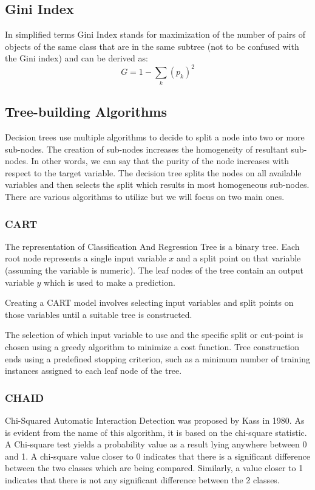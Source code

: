 \documentclass{article}
\begin{document}
\subsection{Gini Index}
In simplified terms Gini Index stands for maximization of the number of pairs of objects of the same class that are in the same subtree (not to be confused with the Gini index) and can be derived as: 
\[ G = 1 - \sum\limits_k (p_k)^2 \]

\subsection{Tree-building Algorithms}
Decision trees use multiple algorithms to decide to split a node into two or more sub-nodes. The creation of sub-nodes increases the homogeneity of resultant sub-nodes. In other words, we can say that the purity of the node increases with respect to the target variable. The decision tree splits the nodes on all available variables and then selects the split which results in most homogeneous sub-nodes. There are various algorithms to utilize but we will focus on two main ones.  
\subsubsection{CART}
The representation of Classification And Regression Tree is a binary tree. Each root node represents a single input variable $x$ and a split point on that variable (assuming the variable is numeric). The leaf nodes of the tree contain an output variable $y$ which is used to make a prediction.

Creating a CART model involves selecting input variables and split points on those variables until a suitable tree is constructed.

The selection of which input variable to use and the specific split or cut-point is chosen using a greedy algorithm to minimize a cost function. Tree construction ends using a predefined stopping criterion, such as a minimum number of training instances assigned to each leaf node of the tree.

\subsubsection{CHAID}
Chi-Squared Automatic Interaction Detection was proposed by Kass \cite{Lewis-Beck2012} in 1980. As is evident from the name of this algorithm, it is based on the chi-square statistic. A Chi-square test yields a probability value as a result lying anywhere between 0 and 1. A chi-square value closer to 0 indicates that there is a significant difference between the two classes which are being compared. Similarly, a value closer to 1 indicates that there is not any significant difference between the 2 classes. 
\end{document}
